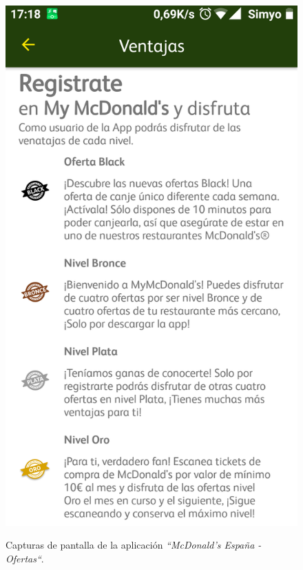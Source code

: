 \documentclass[twoside]{report}
\begin{document}
\begin{figure}[H]
\begin{center}
\includegraphics[scale=0.25]{images/restaurantes/mcdo3.png}
\caption{Capturas de pantalla de la aplicación \textit{“McDonald's España - Ofertas“}.} \cite{mcdo}
\end{center}
\end{figure}
\end{document}
